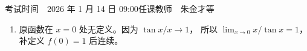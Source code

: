 \documentclass[UTF8,a4paper,zihao=-4,fontset=fandol]{ctexart}
\begin{document}

  {考试时间　2026 年 1 月 14 日 09:00}{任课教师　朱金才等}


\begin{enumerate}
  \item {}
  \wefjnuwork
  原函数在 $x=0$ 处无定义。因为 $\tan x/x\to1$，
  所以 $\displaystyle\lim_{x\to0}x/\tan x=1$，补定义 $f(0)=1$ 后连续。
\end{enumerate}
\end{document}
